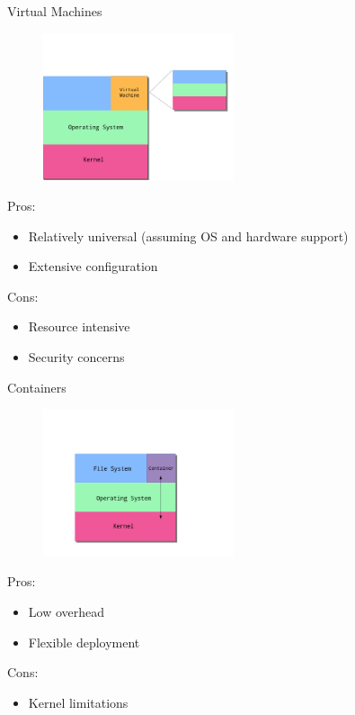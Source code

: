 \documentclass[10pt]{beamer}              %
\begin{document}
\begin{frame}{Virtual Machines}
    
	\begin{figure}[l]
        \centering
        \includegraphics[width=0.5\textwidth]{media/images/comp-vm.png}
    \end{figure}
    Pros:
    \begin{itemize}
        \item Relatively universal (assuming OS and hardware support)
        \item Extensive configuration
    \end{itemize}
    Cons:
    \begin{itemize}
        \item Resource intensive
        \item Security concerns
    \end{itemize}
    
\end{frame}

\begin{frame}[fragile]{Containers}
    
	\begin{figure}[l]
        \includegraphics[width=0.5\textwidth]{media/images/comp-container.png}
    \end{figure}
    Pros:
    \begin{itemize}
        \item Low overhead
        \item Flexible deployment
    \end{itemize}
    Cons:
    \begin{itemize}
        \item Kernel limitations
    \end{itemize}
    
\end{frame}
\end{document}

